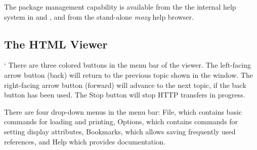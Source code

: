 The {\XicTools} package management capability is available from the
the internal help system in {\Xic} and {\WRspice}, and from the
stand-alone {\it mozy} help browser.

\subsection{The HTML Viewer}
`
There are three colored buttons in the menu bar of the viewer.  The
left-facing arrow button (back) will return to the previous topic
shown in the window.  The right-facing arrow button (forward) will
advance to the next topic, if the back button has been used.  The {\cb
Stop} button will stop HTTP transfers in progress.

There are four drop-down menus in the menu bar:  {\cb File}, which
contains basic commands for loading and printing, {\cb Options}, which
contains commands for setting display attributes, {\cb Bookmarks},
which allows saving frequently used references, and {\cb Help} which
provides documentation.

